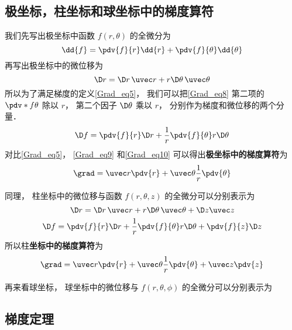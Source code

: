 \subsection{极坐标，柱坐标和球坐标中的梯度算符}

我们先写出极坐标中函数 $f(r,\theta)$ 的全微分为
\begin{equation}\label{Grad_eq8}
\dd{f} = \pdv{f}{r} \dd{r} + \pdv{f}{\theta} \dd{\theta}
\end{equation}
再写出极坐标中的微位移为%
\begin{equation}\label{Grad_eq9}
\D r = \D r \,\uvec r + r\D \theta \,\uvec \theta
\end{equation}
所以为了满足梯度的定义\autoref{Grad_eq5}， 我们可以把\autoref{Grad_eq8} 第二项的 $\pdv*{f}{\theta}$ 除以 $r$， 第二个因子 $\D \theta$ 乘以 $r$， 分别作为梯度和微位移的两个分量．
\begin{equation}\label{Grad_eq10}
\D f = \pdv{f}{r} \D r + \frac 1r \pdv{f}{\theta}  r\D \theta
\end{equation}
对比\autoref{Grad_eq5}， \autoref{Grad_eq9} 和\autoref{Grad_eq10} 可以得出\textbf{极坐标中的梯度算符}为
\begin{equation}
\grad = \uvec r \pdv{r} + \uvec \theta \frac 1r \pdv{\theta}
\end{equation}

同理， 柱坐标中的微位移与函数 $f(r,\theta, z)$ 的全微分可以分别表示为
\begin{equation}
\D r = \D r \,\uvec r + r\D \theta \,\uvec \theta + \D z \uvec z
\end{equation}
\begin{equation}
\D f = \pdv{f}{r} \D r + \frac 1r \pdv{f}{\theta}  r\D \theta + \pdv{f}{z}\D z
\end{equation}
所以柱\textbf{坐标中的梯度算符}为
\begin{equation}
\grad = \uvec r \pdv{r} + \uvec \theta \frac 1r \pdv{\theta} + \uvec z \pdv{z}
\end{equation}

再来看球坐标， 球坐标中的微位移与 $f(r,\theta,\phi)$ 的全微分可以分别表示为



\subsection{梯度定理}

